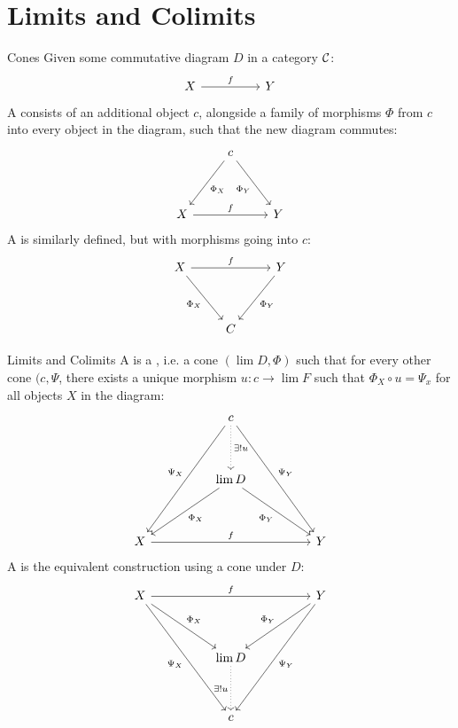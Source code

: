 \chapter{Limits and Colimits}
\begin{importantdefinition}{Cones}{}
	Given some commutative diagram $D$ in a category $\mathcal{C}$:
	\[\begin{tikzcd}
		X && Y
		\arrow["f", from=1-1, to=1-3]
	\end{tikzcd}\]
	A  consists of an additional object $c$, alongside a family of morphisms $\Phi$ from $c$ into every object in the diagram, such that the new diagram commutes:
	\[\begin{tikzcd}
		& c & \\
		\\
		X && Y
		\arrow["{\Phi_X}", from=1-2, to=3-1]
		\arrow["{\Phi_Y}"', from=1-2, to=3-3]
		\arrow["f", from=3-1, to=3-3]
	\end{tikzcd}\]
	A  is similarly defined, but with morphisms going into $c$:
	\[\begin{tikzcd}
		X && Y \\
		\\
		& C
		\arrow["f", from=1-1, to=1-3]
		\arrow["{\Phi_X}"', from=1-1, to=3-2]
		\arrow["{\Phi_Y}", from=1-3, to=3-2]
	\end{tikzcd}\]
\end{importantdefinition}
\begin{importantdefinition}{Limits and Colimits}{}
	A  is a , i.e. a cone $(\lim D, \Phi)$ such that for every other cone $(c, \Psi$, there exists a unique morphism $u : c \to \lim F$ such that $\Phi_X \circ u = \Psi_x$ for all objects $X$ in the diagram:
	\[\begin{tikzcd}
		&& c && \\
		\\
		&& {\lim D} \\
		\\
		X &&&& Y
		\arrow["\exists!u", dotted, from=1-3, to=3-3]
		\arrow["{\Psi_X}"', from=1-3, to=5-1]
		\arrow["{\Psi_Y}", from=1-3, to=5-5]
		\arrow["{\Phi_X}", from=3-3, to=5-1]
		\arrow["{\Phi_Y}"', from=3-3, to=5-5]
		\arrow["f", from=5-1, to=5-5]
	\end{tikzcd}\]
	A  is the equivalent construction using a cone under $D$:
	\[\begin{tikzcd}
		X &&&& Y \\
		\\
		&& {\lim D} \\
		\\
		&& c
		\arrow["f", from=1-1, to=1-5]
		\arrow["{\Phi_X}", from=1-1, to=3-3]
		\arrow["{\Psi_X}"', from=1-1, to=5-3]
		\arrow["{\Phi_Y}"', from=1-5, to=3-3]
		\arrow["{\Psi_Y}", from=1-5, to=5-3]
		\arrow["\exists!u"', dotted, from=3-3, to=5-3]
	\end{tikzcd}\]
\end{importantdefinition}
